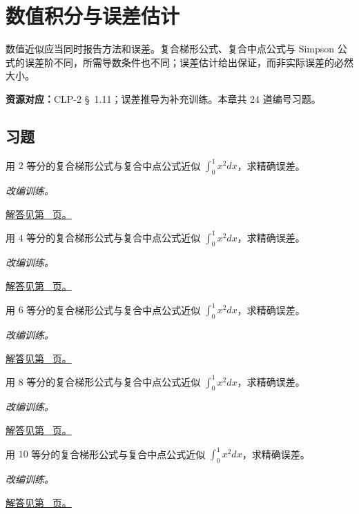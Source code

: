 \documentclass[UTF8,12pt,a4paper,fontset=fandol]{ctexart}
\begin{document}
\clearpage
\section{数值积分与误差估计}\label{sec:ch18}
数值近似应当同时报告方法和误差。复合梯形公式、复合中点公式与 Simpson 公式的误差阶不同，所需导数条件也不同；误差估计给出保证，而非实际误差的必然大小。

\textbf{资源对应：}CLP-2 \S~1.11；误差推导为补充训练。本章共 24 道编号习题。
\subsection{习题}
\begin{example}[二次函数的梯形与中点公式]\label{ex:c18q1}
用 $2$ 等分的复合梯形公式与复合中点公式近似 $\int_0^1x^2dx$，求精确误差。
\par\textit{改编训练。}\par\hyperref[ans:c18q1]{解答见第~\pageref{ans:c18q1} 页。}
\end{example}
\begin{example}[二次函数的梯形与中点公式]\label{ex:c18q2}
用 $4$ 等分的复合梯形公式与复合中点公式近似 $\int_0^1x^2dx$，求精确误差。
\par\textit{改编训练。}\par\hyperref[ans:c18q2]{解答见第~\pageref{ans:c18q2} 页。}
\end{example}
\begin{example}[二次函数的梯形与中点公式]\label{ex:c18q3}
用 $6$ 等分的复合梯形公式与复合中点公式近似 $\int_0^1x^2dx$，求精确误差。
\par\textit{改编训练。}\par\hyperref[ans:c18q3]{解答见第~\pageref{ans:c18q3} 页。}
\end{example}
\begin{example}[二次函数的梯形与中点公式]\label{ex:c18q4}
用 $8$ 等分的复合梯形公式与复合中点公式近似 $\int_0^1x^2dx$，求精确误差。
\par\textit{改编训练。}\par\hyperref[ans:c18q4]{解答见第~\pageref{ans:c18q4} 页。}
\end{example}
\begin{example}[二次函数的梯形与中点公式]\label{ex:c18q5}
用 $10$ 等分的复合梯形公式与复合中点公式近似 $\int_0^1x^2dx$，求精确误差。
\par\textit{改编训练。}\par\hyperref[ans:c18q5]{解答见第~\pageref{ans:c18q5} 页。}
\end{example}
\end{document}
